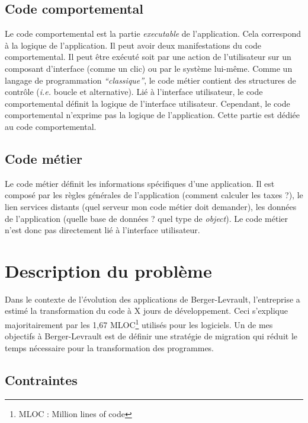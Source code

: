 \documentclass[11pt,]{article}
\begin{document}
\hypertarget{code-comportemental}{%
\subsection{Code comportemental}\label{code-comportemental}}

Le code comportemental est la partie \emph{executable} de l'application.
Cela correspond à la logique de l'application. Il peut avoir deux
manifestations du code comportemental. Il peut être exécuté soit par une
action de l'utilisateur sur un composant d'interface (comme un clic) ou
par le système lui-même. Comme un langage de programmation
\emph{``classique''}, le code métier contient des structures de contrôle
(\emph{i.e.} boucle et alternative). Lié à l'interface utilisateur, le
code comportemental définit la logique de l'interface utilisateur.
Cependant, le code comportemental n'exprime pas la logique de
l'application. Cette partie est dédiée au code comportemental.

\hypertarget{code-muxe9tier}{%
\subsection{Code métier}\label{code-muxe9tier}}

Le code métier définit les informations spécifiques d'une application.
Il est composé par les règles générales de l'application (comment
calculer les taxes ?), le lien services distants (quel serveur mon code
métier doit demander), les données de l'application (quelle base de
données ? quel type de \emph{object}). Le code métier n'est donc pas
directement lié à l'interface utilisateur.

\newpage

\hypertarget{description-du-probluxe8me-1}{%
\section{Description du problème}\label{description-du-probluxe8me-1}}

Dans le contexte de l'évolution des applications de Berger-Levrault,
l'entreprise a estimé la transformation du code à X jours de
développement. Ceci s'explique majoritairement par les 1,67
MLOC\footnote{MLOC : Million lines of code} utilisés pour les logiciels.
Un de mes objectifs à Berger-Levrault est de définir une stratégie de
migration qui réduit le temps nécessaire pour la transformation des
programmes.

\hypertarget{contraintes}{%
\subsection{Contraintes}\label{contraintes}}
\end{document}
